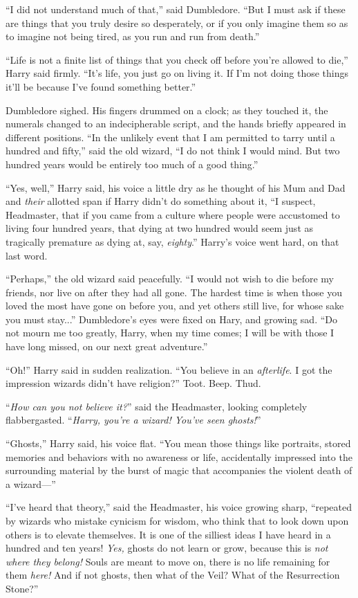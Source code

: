 “I did not understand much of that,” said Dumbledore. “But I must ask if these are things that you truly desire so desperately, or if you only imagine them so as to imagine not being tired, as you run and run from death.”

“Life is not a finite list of things that you check off before you’re allowed to die,” Harry said firmly. “It’s life, you just go on living it. If I’m not doing those things it’ll be because I’ve found something better.”

Dumbledore sighed. His fingers drummed on a clock; as they touched it, the numerals changed to an indecipherable script, and the hands briefly appeared in different positions. “In the unlikely event that I am permitted to tarry until a hundred and fifty,” said the old wizard, “I do not think I would mind. But two hundred years would be entirely too much of a good thing.”

“Yes, well,” Harry said, his voice a little dry as he thought of his Mum and Dad and \emph{their} allotted span if Harry didn’t do something about it, “I suspect, Headmaster, that if you came from a culture where people were accustomed to living four hundred years, that dying at two hundred would seem just as tragically premature as dying at, say, \emph{eighty}.” Harry’s voice went hard, on that last word.

“Perhaps,” the old wizard said peacefully. “I would not wish to die before my friends, nor live on after they had all gone. The hardest time is when those you loved the most have gone on before you, and yet others still live, for whose sake you must stay...” Dumbledore’s eyes were fixed on Hary, and growing sad. “Do not mourn me too greatly, Harry, when my time comes; I will be with those I have long missed, on our next great adventure.”

“Oh!” Harry said in sudden realization. “You believe in an \emph{afterlife}. I got the impression wizards didn’t have religion?”
\sbreak
Toot. Beep. Thud.

“\emph{How can you not believe it?}” said the Headmaster, looking completely flabbergasted. “\emph{Harry, you’re a wizard! You’ve seen ghosts!}”

“Ghosts,” Harry said, his voice flat. “You mean those things like portraits, stored memories and behaviors with no awareness or life, accidentally impressed into the surrounding material by the burst of magic that accompanies the violent death of a wizard—”

“I’ve heard that theory,” said the Headmaster, his voice growing sharp, “repeated by wizards who mistake cynicism for wisdom, who think that to look down upon others is to elevate themselves. It is one of the silliest ideas I have heard in a hundred and ten years! \emph{Yes,} ghosts do not learn or grow, because this is \emph{not where they belong!} Souls are meant to move on, there is no life remaining for them \emph{here!} And if not ghosts, then what of the Veil? What of the Resurrection Stone?”

